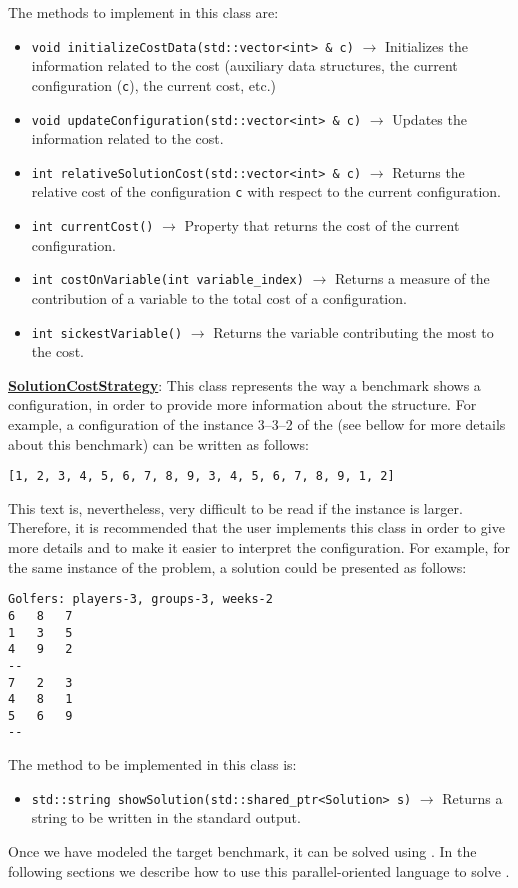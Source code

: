 The methods to implement in this class are:

\begin{itemize}
\item \verb|void initializeCostData(std::vector<int> & c)| $\rightarrow$ Initializes the information related to the cost (auxiliary data structures, the current configuration (\verb|c|), the current cost, etc.)
\item \verb|void updateConfiguration(std::vector<int> & c)| $\rightarrow$ Updates the information related to the cost.
\item \verb|int relativeSolutionCost(std::vector<int> & c)| $\rightarrow$ Returns the relative cost of the configuration \verb|c| with respect to the current configuration.
\item \verb|int currentCost()| $\rightarrow$ Property that returns the cost of the current configuration.
\item \verb|int costOnVariable(int variable_index)| $\rightarrow$ Returns a measure of the contribution of a variable to the total cost of a configuration. %
\item \verb|int sickestVariable()| $\rightarrow$ Returns the variable contributing the most to the cost.
\end{itemize}

\underline{\textbf{SolutionCostStrategy}}: This class represents the way a benchmark shows a configuration, in order to provide more information about the structure. For example, a configuration of the instance 3--3--2 of the \sgp{} (see bellow for more details about this benchmark) can be written as follows:

\begin{Verbatim}
[1, 2, 3, 4, 5, 6, 7, 8, 9, 3, 4, 5, 6, 7, 8, 9, 1, 2]
\end{Verbatim}

This text is, nevertheless, very difficult to be read if the instance is larger. Therefore, it is recommended that the user implements this class in order to give more details and to make it easier to interpret the configuration. For example, for the same instance of the problem, a solution could be presented as follows:

\begin{Verbatim}
Golfers: players-3, groups-3, weeks-2
6	8	7	
1	3	5	
4	9	2	
--
7	2	3	
4	8	1	
5	6	9	
--
\end{Verbatim}

The method to be implemented in this class is:

\begin{itemize}
\item \verb|std::string showSolution(std::shared_ptr<Solution> s)| $\rightarrow$ Returns a string to be written in the standard output.
\end{itemize}

Once we have modeled the target benchmark, it can be solved using \posl{}. In the following sections we describe how to use this parallel-oriented language to solve \CSPs.